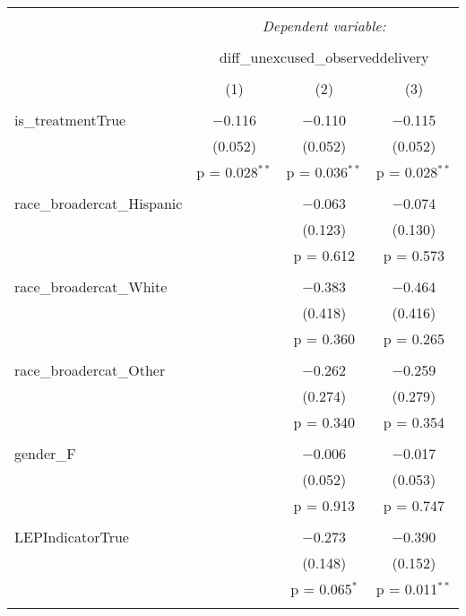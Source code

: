 
\begin{table}[!htbp] \centering 
  \caption{} 
  \label{} 
\begin{tabular}{@{\extracolsep{5pt}}lccc} 
\\[-1.8ex]\hline 
\hline \\[-1.8ex] 
 & \multicolumn{3}{c}{\textit{Dependent variable:}} \\ 
\cline{2-4} 
\\[-1.8ex] & \multicolumn{3}{c}{diff\_unexcused\_observeddelivery} \\ 
\\[-1.8ex] & (1) & (2) & (3)\\ 
\hline \\[-1.8ex] 
 is\_treatmentTrue & $-$0.116 & $-$0.110 & $-$0.115 \\ 
  & (0.052) & (0.052) & (0.052) \\ 
  & p = 0.028$^{**}$ & p = 0.036$^{**}$ & p = 0.028$^{**}$ \\ 
  & & & \\ 
 race\_broadercat\_Hispanic &  & $-$0.063 & $-$0.074 \\ 
  &  & (0.123) & (0.130) \\ 
  &  & p = 0.612 & p = 0.573 \\ 
  & & & \\ 
 race\_broadercat\_White &  & $-$0.383 & $-$0.464 \\ 
  &  & (0.418) & (0.416) \\ 
  &  & p = 0.360 & p = 0.265 \\ 
  & & & \\ 
 race\_broadercat\_Other &  & $-$0.262 & $-$0.259 \\ 
  &  & (0.274) & (0.279) \\ 
  &  & p = 0.340 & p = 0.354 \\ 
  & & & \\ 
 gender\_F &  & $-$0.006 & $-$0.017 \\ 
  &  & (0.052) & (0.053) \\ 
  &  & p = 0.913 & p = 0.747 \\ 
  & & & \\ 
 LEPIndicatorTrue &  & $-$0.273 & $-$0.390 \\ 
  &  & (0.148) & (0.152) \\ 
  &  & p = 0.065$^{*}$ & p = 0.011$^{**}$ \\ 
  & & & \\ 

\end{tabular}
\end{table}
